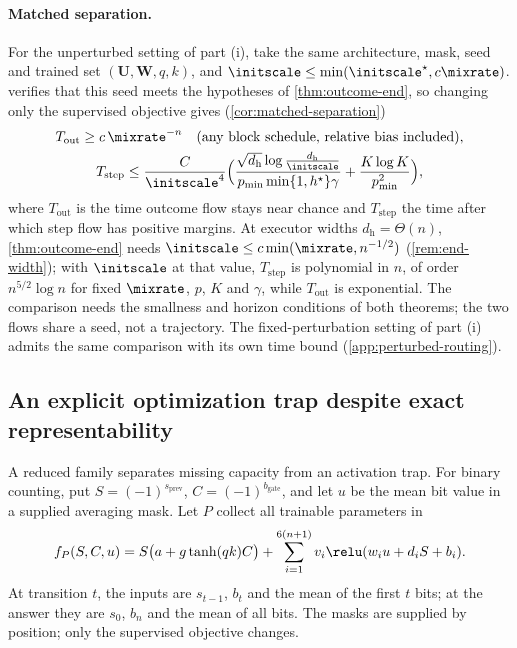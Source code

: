 \paragraph{Matched separation.} For the unperturbed setting of part (i), take the same architecture, mask, seed and trained set $(\mathbf U,\mathbf W,q,k)$, and $\initscale\le\min(\initscale^\star,c\mixrate)$.
 verifies that this seed meets the hypotheses of \cref{thm:outcome-end}, so changing only the supervised objective gives
(\cref{cor:matched-separation})
\begin{gather*}
 T_{\mathrm{out}}\ge c\,\mixrate^{-n}\quad\text{(any block schedule, relative bias included)},\\
 T_{\mathrm{step}}\le\frac{C}{\initscale^4}\Bigl(\frac{\sqrt{d_{\mathrm h}}\log\frac{d_{\mathrm h}}{\initscale}}{p_{\min}\min\{1,h^\star\}\gamma}+\frac{K\log K}{p_{\min}^2}\Bigr),
\end{gather*}
where $T_{\mathrm{out}}$ is the time outcome flow stays near chance and $T_{\mathrm{step}}$ the time after which step flow has positive margins. At executor
widths $d_{\mathrm h}=\Theta(n)$, \cref{thm:outcome-end} needs $\initscale\le c\min(\mixrate,n^{-1/2})$ (\cref{rem:end-width}); with $\initscale$ at that value, $T_{\mathrm{step}}$ is polynomial
in $n$, of order $n^{5/2}\log n$ for fixed $\mixrate$, $p$, $K$ and $\gamma$, while $T_{\mathrm{out}}$ is exponential. The comparison needs the smallness and horizon conditions of both theorems; the two flows share a seed, not a trajectory.
The fixed-perturbation setting of part (i) admits the same comparison with its own time bound (\cref{app:perturbed-routing}).

\subsection{An explicit optimization trap despite exact representability}
\label{sec:two-path-trap}
A reduced family separates missing capacity from an activation trap. For binary
counting, put $S=(-1)^{s_{\mathrm{prev}}}$, $C=(-1)^{b_{\mathrm{gate}}}$,
and let $u$ be the mean bit value in a supplied averaging mask. Let $P$ collect all trainable parameters in
\begin{equation}
 f_P(S,C,u)=S\bigl(a+g\tanh(qk)C\bigr)
 +\sum_{i=1}^{6(n+1)}v_i\relu(w_i u+d_iS+b_i).
 \label{eq:two-path-model}
\end{equation}
At transition $t$, the inputs are $s_{t-1}$, $b_t$ and the mean of the first
$t$ bits; at the answer they are $s_0$, $b_n$ and the mean of all bits.
The masks are supplied by position; only the supervised objective changes.

